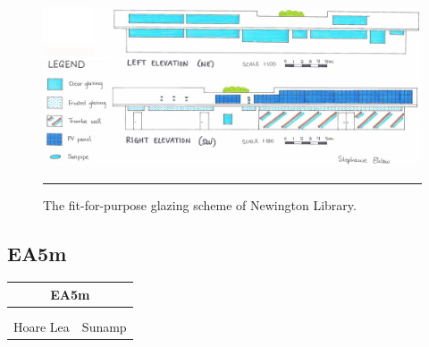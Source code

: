 \begin{figure}[htbp]
	\centering
	\includegraphics[width=\textwidth]{figures/NL-nl.png}
	\rule{\textwidth}{0.5pt} %
	\caption{The fit-for-purpose glazing scheme of Newington Library.}
	\label{fig:nl}
\end{figure}









\newpage
\subsection*{EA5m}

\begin{table}
	\begin{tabular}{|ll|}
		\hline
		\multicolumn{2}{|c|}{\cellcolor[HTML]{F8A102}\textbf{EA5m \master}} \\ \hline
		\EnBldgs & \PRJ \\
		\DST & \ICP \\
		Hoare Lea & Sunamp \\ \hline
	\end{tabular}
\end{table}

